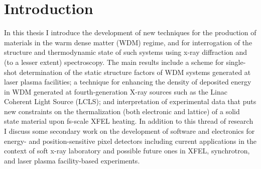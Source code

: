 \documentclass [11pt, proquest, article] {uwthesis}[2016/11/22]
\begin{document}
% 
% 

%
%

%
 
 
 
%
%

\textpages
 
 
\chapter {Introduction}
 
In this thesis I introduce the development of new techniques for the production of materials in the warm dense matter (WDM) regime, and for interrogation of the structure and thermodynamic state of such systems using x-ray diffraction and (to a lesser extent) spectroscopy. The main results include a scheme for single-shot determination of the static structure factors of WDM systems generated at laser plasma facilities; a technique for enhancing the density of deposited energy in WDM generated at fourth-generation X-ray sources such as the Linac Coherent Light Source (LCLS); and interpretation of experimental data that puts new constraints on the thermalization (both electronic and lattice) of a solid state material upon fs-scale XFEL heating. In addition to this thread of research I discuss some secondary work on the development of software and electronics for energy- and position-sensitive pixel detectors including current applications in the context of soft x-ray laboratory and possible future ones in XFEL, synchrotron, and laser plasma facility-based experiments.
\end{document}
